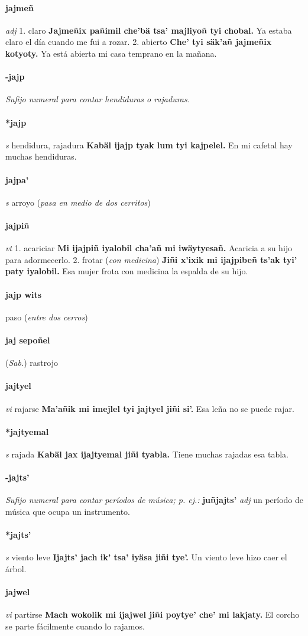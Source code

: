 \documentclass{scrbook}
\newcommand{\entry}[1]{\paragraph{#1}}
\newcommand{\onedefinition}[1]{#1.}
\newcommand{\nontranslationdef}[1]{\textit{#1}}
\newcommand{\partofspeech}[1]{\textit{#1}}
\newcommand{\spanishtranslation}[1]{#1}
\newcommand{\clarification}[1]{(\textit{#1})}
\newcommand{\cholexample}[1]{\textbf{#1}}
\newcommand{\exampletranslation}[1]{#1}
\newcommand{\relevantdialect}[1]{(\textit{#1})}
\begin{document}
\begin{multicols}{2}
\entry{jajmeñ}
\partofspeech{adj}
\onedefinition{1}
\spanishtranslation{claro}
\cholexample{Jajmeñix pañimil che'bä tsa' majliyoñ tyi chobal.}
\exampletranslation{Ya estaba claro el día cuando me fui a rozar.}
\onedefinition{2}
\spanishtranslation{abierto}
\cholexample{Che' tyi säk'añ jajmeñix kotyoty.}
\exampletranslation{Ya está abierta mi casa temprano en la mañana.}

\entry{-jajp}
\nontranslationdef{Sufijo numeral para contar hendiduras o rajaduras.}

\entry{*jajp}
\partofspeech{s}
\spanishtranslation{hendidura, rajadura}
\cholexample{Kabäl ijajp tyak lum tyi kajpelel.}
\exampletranslation{En mi cafetal hay muchas hendiduras.}

\entry{jajpa'}
\partofspeech{s}
\spanishtranslation{arroyo}
\clarification{pasa en medio de dos cerritos}

\entry{jajpiñ}
\partofspeech{vt}
\onedefinition{1}
\spanishtranslation{acariciar}
\cholexample{Mi ijajpiñ iyalobil cha'añ mi iwäytyesañ.}
\exampletranslation{Acaricia a su hijo para adormecerlo.}
\onedefinition{2}
\spanishtranslation{frotar}
\clarification{con medicina}
\cholexample{Jiñi x'ixik mi ijajpibeñ ts'ak tyi' paty iyalobil.}
\exampletranslation{Esa mujer frota con medicina la espalda de su hijo.}

\entry{jajp wits}
\spanishtranslation{paso}
\clarification{entre dos cerros}

\entry{jaj sepoñel}
\relevantdialect{Sab.}
\spanishtranslation{rastrojo}

\entry{jajtyel}
\partofspeech{vi}
\spanishtranslation{rajarse}
\cholexample{Ma'añik mi imejlel tyi jajtyel jiñi si'.}
\exampletranslation{Esa leña no se puede rajar.}

\entry{*jajtyemal}
\partofspeech{s}
\spanishtranslation{rajada}
\cholexample{Kabäl jax ijajtyemal jiñi tyabla.}
\exampletranslation{Tiene muchas rajadas esa tabla.}

\entry{-jajts'}
\nontranslationdef{Sufijo numeral para contar períodos de música; p. ej.:}
\cholexample{juñjajts'}
\partofspeech{adj}
\exampletranslation{un período de música que ocupa un instrumento.}

\entry{*jajts'}
\partofspeech{s}
\spanishtranslation{viento leve}
\cholexample{Ijajts' jach ik' tsa' iyäsa jiñi tye'.}
\exampletranslation{Un viento leve hizo caer el árbol.}

\entry{jajwel}
\partofspeech{vi}
\spanishtranslation{partirse}
\cholexample{Mach wokolik mi ijajwel jiñi poytye' che' mi lakjaty.}
\exampletranslation{El corcho se parte fácilmente cuando lo rajamos.}


\end{multicols}
\end{document}
